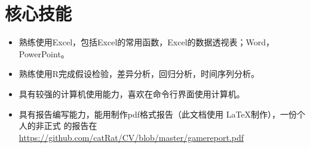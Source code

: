 \section{核心技能}
\begin{itemize}
\item 熟练使用Excel，包括Excel的常用函数，Excel的数据透视表；Word，PowerPoint。
\item 熟练使用R完成假设检验，差异分析，回归分析，时间序列分析。
\item 具有较强的计算机使用能力，喜欢在命令行界面使用计算机。
\item 具有报告编写能力，能用制作pdf格式报告（此文档使用 \LaTeX 制作），一份个人的非正式 
的报告在\url{https://github.com/catRat/CV/blob/master/gamereport.pdf}
\end{itemize}
